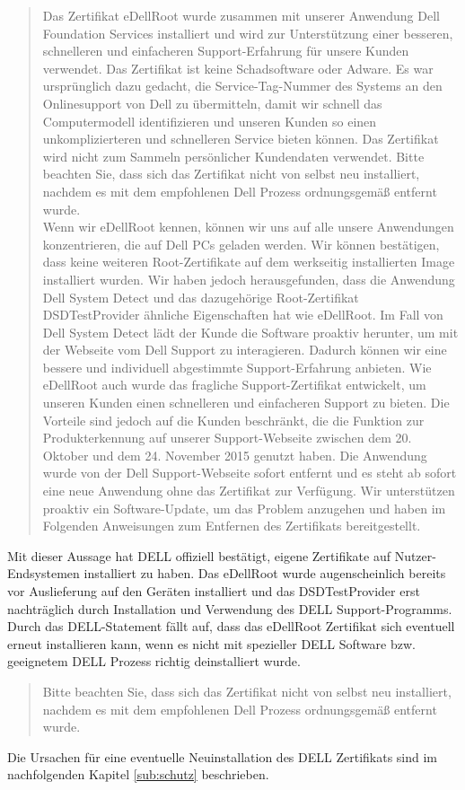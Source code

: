 \begin{quote}
	\glqq[...] Das Zertifikat eDellRoot wurde zusammen mit unserer Anwendung Dell Foundation Services installiert und wird zur Unterstützung einer besseren, schnelleren und einfacheren Support-Erfahrung für unsere Kunden verwendet. Das Zertifikat ist keine Schadsoftware oder Adware. Es war ursprünglich dazu gedacht, die Service-Tag-Nummer des Systems an den Onlinesupport von Dell zu übermitteln, damit wir schnell das Computermodell identifizieren und unseren Kunden so einen unkomplizierteren und schnelleren Service bieten können. Das Zertifikat wird nicht zum Sammeln persönlicher Kundendaten verwendet. Bitte beachten Sie, dass sich das Zertifikat nicht von selbst neu installiert, nachdem es mit dem empfohlenen Dell Prozess ordnungsgemäß entfernt wurde.\\
	Wenn wir eDellRoot kennen, können wir uns auf alle unsere Anwendungen konzentrieren, die auf Dell PCs geladen werden. Wir können bestätigen, dass keine weiteren Root-Zertifikate auf dem werkseitig installierten Image installiert wurden. Wir haben jedoch herausgefunden, dass die Anwendung Dell System Detect  und das dazugehörige Root-Zertifikat DSDTestProvider ähnliche Eigenschaften hat wie eDellRoot. Im Fall von Dell System Detect lädt der Kunde die Software proaktiv herunter, um mit der Webseite vom Dell Support zu interagieren. Dadurch können wir eine bessere und individuell abgestimmte Support-Erfahrung anbieten. Wie eDellRoot auch wurde das fragliche Support-Zertifikat entwickelt, um unseren Kunden einen schnelleren und einfacheren Support zu bieten. Die Vorteile sind jedoch auf die Kunden beschränkt, die die Funktion zur Produkterkennung auf unserer Support-Webseite zwischen dem 20. Oktober und dem 24. November 2015 genutzt haben. Die Anwendung wurde von der Dell Support-Webseite sofort entfernt und es steht ab sofort eine neue Anwendung ohne das Zertifikat zur Verfügung. Wir unterstützen proaktiv ein Software-Update, um das Problem anzugehen und haben im Folgenden Anweisungen zum Entfernen des Zertifikats bereitgestellt.\grqq \cite{dell}
\end{quote}
Mit dieser Aussage hat DELL offiziell bestätigt, eigene Zertifikate auf Nutzer-Endsystemen installiert zu haben. Das eDellRoot wurde augenscheinlich bereits vor Auslieferung auf den Geräten installiert und das DSDTestProvider erst nachträglich durch Installation und Verwendung des DELL Support-Programms. Durch das DELL-Statement fällt auf, dass das eDellRoot Zertifikat sich eventuell erneut installieren kann, wenn es nicht mit spezieller DELL Software bzw. geeignetem DELL Prozess richtig deinstalliert wurde. 
\begin{quote}
	\glqq[...] Bitte beachten Sie, dass sich das Zertifikat nicht von selbst neu installiert, nachdem es mit dem empfohlenen Dell Prozess ordnungsgemäß entfernt wurde.\grqq \cite{dell}
\end{quote}
Die Ursachen für eine eventuelle Neuinstallation des DELL Zertifikats sind im nachfolgenden Kapitel \ref{sub:schutz}  beschrieben.